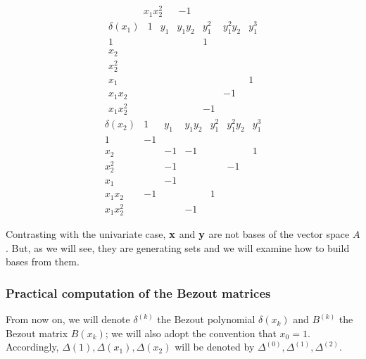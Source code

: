 \documentclass{standalone}
\begin{document}
\begin{exmp}
$$\begin{array}{c|cccccc}
	x_1x_2^2 &  & -1 &  &  &  &
\end{array}$$
$$\begin{array}{c|cccccc}
	\delta(x_1) & 1 & y_1 & y_1y_2 & y_1^2 & y_1^2y_2 & y_1^3 \\
	\hline
	1 &  &  &  & 1 &  & \\
	x_2 &  &  &  &  &  & \\
	x_2^2 &  &  &  &  &  & \\
	x_1 &  &  &  &  &  & 1\\
	x_1x_2 &  &  &  &  & -1 & \\
	x_1x_2^2 &  &  &  & -1 &  &
\end{array}$$
$$\begin{array}{c|cccccc}
	\delta(x_2) & 1 & y_1 & y_1y_2 & y_1^2 & y_1^2y_2 & y_1^3 \\
	\hline
	1 & -1 &  &  &  &  & \\
	x_2 &  & -1 & -1 &  &  & 1\\
	x_2^2 &  & -1 &  &  & -1 & \\
	x_1 &  & -1 &  &  &  & \\
	x_1x_2 & -1 &  &  & 1 &  & \\
	x_1x_2^2 &  &  & -1 &  &  &
\end{array}$$

\end{exmp}

\begin{rem}
Contrasting with the univariate case, $\bold{x}$ and $\bold{y}$ are not bases of the vector space $A$. 
But, as we will see, they are  generating sets and we will examine how to build bases from them.
\end{rem}

\subsubsection{Practical computation of the Bezout matrices}
From now on, we will denote $\delta^{(k)}$ the Bezout polynomial $\delta(x_k)$ and $B^{(k)}$ the Bezout matrix $B(x_k)$; we will also adopt the convention that $x_0 = 1$. Accordingly, $\Delta(1), \Delta(x_1), \Delta(x_2)$ will be denoted by $\Delta^{(0)}, \Delta^{(1)}, \Delta^{(2)}$.
\end{document}
